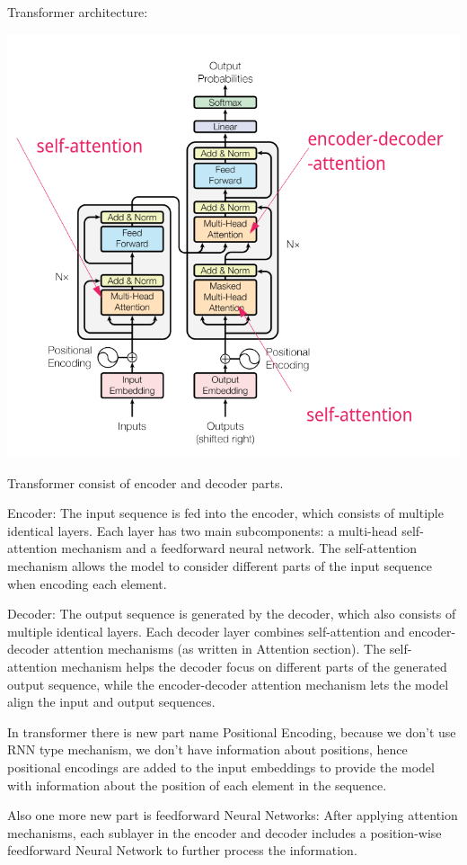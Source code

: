 \documentclass{article}
\begin{document}
Transformer architecture:

\includegraphics[scale=1.0]{figures/Transformer.png}

Transformer consist of encoder and decoder parts.

Encoder: The input sequence is fed into the encoder, which consists of multiple identical layers. Each layer has two main subcomponents: a multi-head self-attention mechanism and a feedforward neural network. The self-attention mechanism allows the model to consider different parts of the input sequence when encoding each element.

Decoder: The output sequence is generated by the decoder, which also consists of multiple identical layers. Each decoder layer combines self-attention and encoder-decoder attention mechanisms (as written in Attention section). The self-attention mechanism helps the decoder focus on different parts of the generated output sequence, while the encoder-decoder attention mechanism lets the model align the input and output sequences.

In transformer there is new part name Positional Encoding, because we don't use RNN type mechanism, we don't have information about positions, hence positional encodings are added to the input embeddings to provide the model with information about the position of each element in the sequence.

Also one more new part is feedforward Neural Networks: After applying attention mechanisms, each sublayer in the encoder and decoder includes a position-wise feedforward Neural Network to further process the information.
\end{document}
